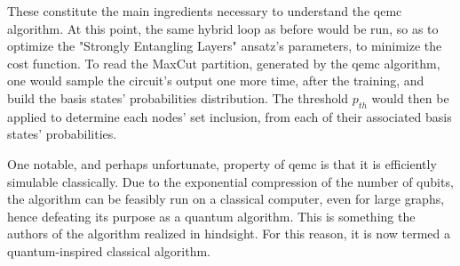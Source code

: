 These constitute the main ingredients necessary to understand the \acrshort{qemc} algorithm. At this point, the same hybrid loop as before would be run, so as to optimize the "Strongly Entangling Layers" ansatz's parameters, to minimize the cost function. To read the MaxCut partition, generated by the \acrshort{qemc} algorithm, one would sample the circuit's output one more time, after the training, and build the basis states' probabilities distribution. The threshold $p_{th}$ would then be applied to determine each nodes' set inclusion, from each of their associated basis states' probabilities.

One notable, and perhaps unfortunate, property of \acrshort{qemc} is that it is efficiently simulable classically. Due to the exponential compression of the number of qubits, the algorithm can be feasibly run on a classical computer, even for large graphs, hence defeating its purpose as a quantum algorithm. This is something the authors of the algorithm \cite{tenecohen2023variational} realized in hindsight. For this reason, it is now termed a quantum-inspired classical algorithm.







